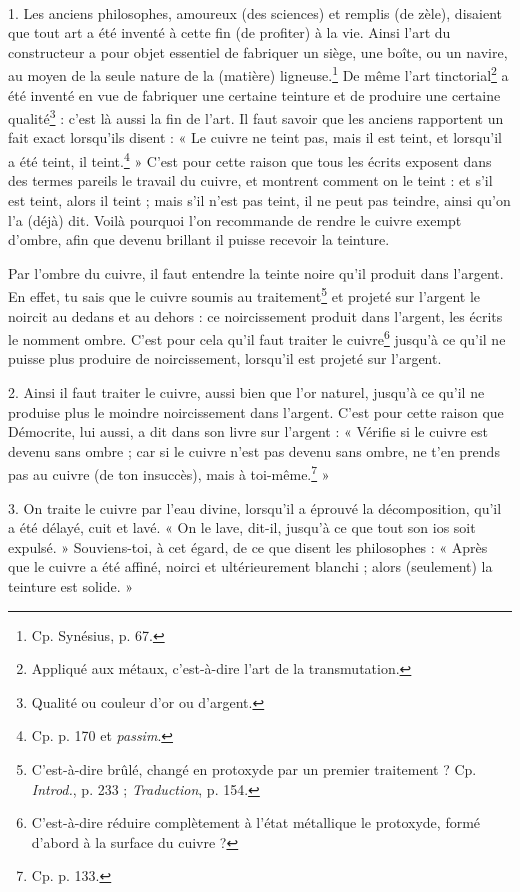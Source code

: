 \documentclass[a4paper, 11pt, oneside, polutonikogreek, french]{article}
\begin{document}
\paragraph{}
1. Les anciens philosophes, amoureux (des sciences) et remplis (de zèle), disaient que tout art a été inventé à cette fin (de profiter) à la vie. Ainsi l'art du constructeur a pour objet essentiel de fabriquer un siège, une boîte, ou un navire, au moyen de la seule nature de la (matière) ligneuse.\footnote{Cp. Synésius, p. 67.} De même l'art tinctorial\footnote{Appliqué aux métaux, c'est-à-dire l'art de la transmutation.} a été inventé en vue de fabriquer une certaine teinture et de produire une certaine qualité\footnote{Qualité ou couleur d'or ou d'argent.} : c'est là aussi la fin de l'art. Il faut savoir que les anciens rapportent un fait exact lorsqu'ils disent : « Le cuivre ne teint pas, mais il est teint, et lorsqu'il a été teint, il teint.\footnote{Cp. p. 170 et \emph{passim}.} » C'est pour cette raison que tous les écrits exposent dans des termes pareils le travail du cuivre, et montrent comment on le teint : et s'il est teint, alors il teint ; mais s'il n'est pas teint, il ne peut pas teindre, ainsi qu'on l'a (déjà) dit. Voilà pourquoi l'on recommande de rendre le cuivre exempt d'ombre, afin que devenu brillant il puisse recevoir la teinture.

Par l'ombre du cuivre, il faut entendre la teinte noire qu'il produit dans l'argent. En effet, tu sais que le cuivre soumis au traitement\footnote{C'est-à-dire brûlé, changé en protoxyde par un premier traitement ? Cp. \emph{Introd.}, p. 233 ; \emph{Traduction}, p. 154.} et projeté sur l'argent le noircit au dedans et au dehors : ce noircissement produit dans l'argent, les écrits le nomment ombre. C'est pour cela qu'il faut traiter le cuivre\footnote{C'est-à-dire réduire complètement à l'état métallique le protoxyde, formé d'abord à la surface du cuivre ?} jusqu'à ce qu'il ne puisse plus produire de noircissement, lorsqu'il est projeté sur l'argent.

2. Ainsi il faut traiter le cuivre, aussi bien que l'or naturel, jusqu'à ce qu'il ne produise plus le moindre noircissement dans l'argent. C'est pour cette raison que Démocrite, lui aussi, a dit dans son livre sur l'argent : « Vérifie si le cuivre est devenu sans ombre ; car si le cuivre n'est pas devenu sans ombre, ne t'en prends pas au cuivre (de ton insuccès), mais à toi-même.\footnote{Cp. p. 133.} »

3. On traite le cuivre par l'eau divine, lorsqu'il a éprouvé la décomposition, qu'il a été délayé, cuit et lavé. « On le lave, dit-il, jusqu'à ce que tout son ios soit expulsé. » Souviens-toi, à cet égard, de ce que disent les philosophes : « Après que le cuivre a été affiné, noirci et ultérieurement blanchi ; alors (seulement) la teinture est solide. »
\end{document}

